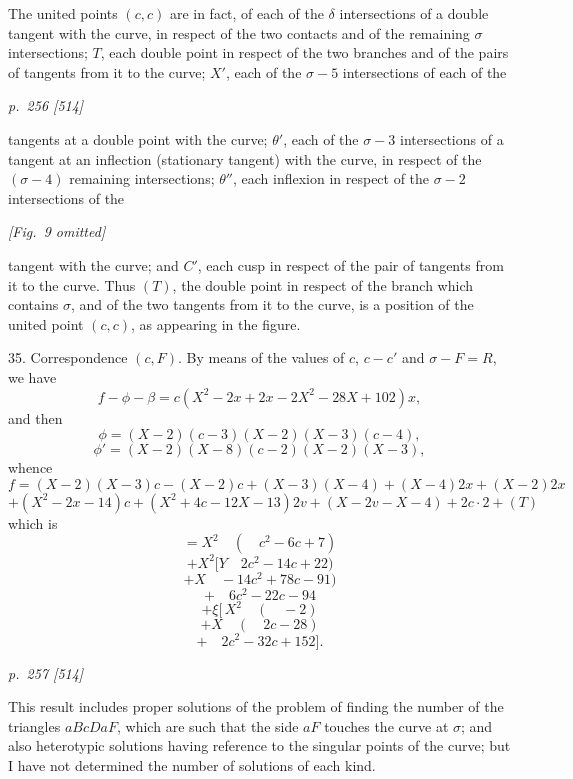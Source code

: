\documentclass[11pt,a4paper]{book}
\begin{document}
The united points $(c, c)$ are in fact, of each of the $\delta$ intersections of a double tangent with the curve, in respect of the two contacts and of the remaining $\sigma$
intersections; $T$, each double point in respect of the two branches and of the pairs
of tangents from it to the curve; $X'$, each of the $\sigma - 5$ intersections of each of the

\clearpage

\bigskip
\textit{p.~256 [514]}
\smallskip

\noindent
tangents at a double point with the curve; $\theta'$, each of the $\sigma - 3$ intersections of a
tangent at an inflection (stationary tangent) with the curve, in respect of the $(\sigma - 4)$
remaining intersections; $\theta''$, each inflexion in respect of the $\sigma - 2$ intersections of the

\begin{center}
\textit{[Fig.~9 omitted]}
\end{center}

tangent with the curve; and $C'$, each cusp in respect of the pair of tangents from
it to the curve.  Thus $(T)$, the double point in respect of the branch which contains $\sigma$,
and of the two tangents from it to the curve, is a position of the united point
$(c, c)$, as appearing in the figure.

35.  Correspondence $(c, F)$.  By means of the values of $c$, $c - c'$ and $\sigma - F = R$,
we have
\[
f - \phi - \beta = c(X^2 - 2x + 2x - 2X^2 - 28X + 102)x,
\]
and then
\[
\phi = (X - 2)(c - 3)(X - 2)(X - 3)(c - 4),
\]
\[
\phi' = (X - 2)(X - 8)(c - 2)(X - 2)(X - 3),
\]
whence
\[
f = (X - 2)(X - 3)c - (X - 2)c + (X - 3)(X - 4) + (X - 4)2x + (X - 2)2x
\]
\[
+ (X^2 - 2x - 14)c + (X^2 + 4c - 12X - 13)2v + (X - 2v - X - 4) + 2c \cdot 2 + (T)
\]
which is
\[
= X^2 \quad ( \quad c^2 - 6c + 7)
\]
\[
+ X^2[Y \quad 2c^2 - 14c + 22)
\]
\[
+ X \quad -14c^2 + 78c - 91)
\]
\[
+ \quad 6c^2 - 22c - 94
\]
\[
+ \xi [\,X^2 \quad (\quad - 2)
\]
\[
+ X \quad ( \quad 2c - 28)
\]
\[
+ \quad 2c^2 - 32c + 152].
\]

\clearpage

\bigskip
\textit{p.~257 [514]}
\smallskip

This result includes proper solutions of the problem of finding the number of
the triangles $aBcD aF$, which are such that the side $aF$ touches the curve at $\sigma$; and
also heterotypic solutions having reference to the singular points of the curve; but
I have not determined the number of solutions of each kind.
\end{document}
